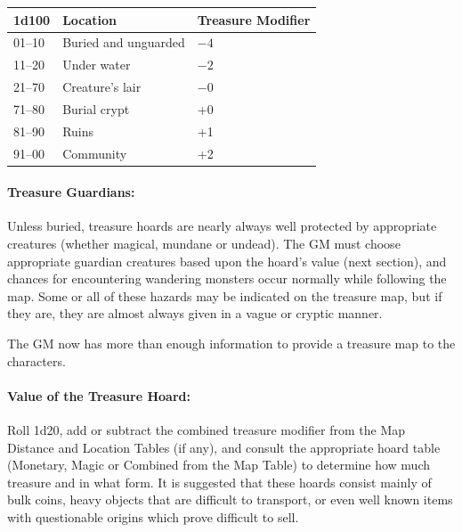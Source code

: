 \begin{multicols}{2}
\noindent
\begin{minipage}{\columnwidth}

\label{maplocation}
\noindent
\begin{tabular}{|p{}|p{}|p{}|}
\hline
1d100	& Location	& Treasure Modifier \\
\hline\hline
\rowcolor[gray]{.9}01--10	& Buried and unguarded	& $-4$ \\
11--20	& Under water	& $-2$ \\
\rowcolor[gray]{.9}21--70	& Creature's lair	& $-$0 \\
71--80	& Burial crypt	& +0 \\
\rowcolor[gray]{.9}81--90	& Ruins	& +1 \\
91--00	& Community	& +2 \\
\hline
\end{tabular}

\end{minipage}

\paragraph{Treasure Guardians:} Unless buried, treasure hoards are nearly always well protected by appropriate creatures (whether magical, mundane or undead).  The GM must choose appropriate guardian creatures based upon the hoard's value (next section), and chances for encountering wandering monsters occur normally while following the map.  Some or all of these hazards may be indicated on the treasure map, but if they are, they are almost always given in a vague or cryptic manner.

The GM now has more than enough information to provide a treasure map to the characters.  

\paragraph{Value of the Treasure Hoard:} Roll 1d20, add or subtract the combined treasure modifier from the Map Distance and Location Tables (if any), and consult the appropriate hoard table (Monetary, Magic or Combined from the Map Table) to determine how much treasure and in what form.  It is suggested that these hoards consist mainly of bulk coins, heavy objects that are difficult to transport, or even well known items with questionable origins which prove difficult to sell.

\noindent
\begin{minipage}{\columnwidth}


\end{minipage}
\end{multicols}
